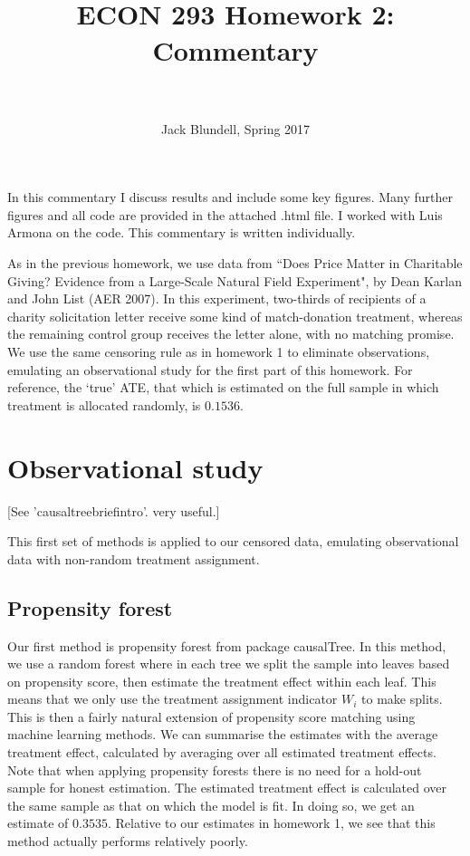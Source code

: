 \documentclass[paper=letter, fontsize=11pt]{scrartcl} %
\title{	
\normalfont \normalsize 
\horrule{0.5pt} \\[0.4cm] %
 \large{{\textbf{ECON 293 Homework 2: Commentary}}} \\ %
\horrule{2pt} \\[0.5cm] %
}
\author{\small{Jack Blundell, Spring 2017}} %
\date{} %
\begin{document}
\maketitle %

In this commentary I discuss results and include some key figures. Many further figures and all code are provided in the attached .html file. I worked with Luis Armona on the code. This commentary is written individually.

As in the previous homework, we use data from ``Does Price Matter in Charitable Giving? Evidence from a Large-Scale Natural Field Experiment", by Dean Karlan and John List (AER 2007). In this experiment, two-thirds of recipients of a charity solicitation letter receive some kind of match-donation treatment, whereas the remaining control group receives the letter alone, with no matching promise. We use the same censoring rule as in homework 1 to eliminate observations, emulating an observational study for the first part of this homework. For reference, the `true' ATE, that which is estimated on the full sample in which treatment is allocated randomly, is $0.1536$.

\section{Observational study}

[See 'causaltreebriefintro'. very useful.]

This first set of methods is applied to our censored data, emulating observational data with non-random treatment assignment.

\subsection{Propensity forest}

Our first method is propensity forest from package causalTree. In this method, we use a random forest where in each tree we split the sample into leaves based on propensity score, then estimate the treatment effect within each leaf. This means that we only use the treatment assignment indicator $W_i$ to make splits. This is then a fairly natural extension of propensity score matching using machine learning methods. We can summarise the estimates with the average treatment effect, calculated by averaging over all estimated treatment effects. Note that when applying propensity forests there is no need for a hold-out sample for honest estimation. The estimated treatment effect is calculated over the same sample as that on which the model is fit. In doing so, we get an estimate of $0.3535$. Relative to our estimates in homework 1, we see that this method actually performs relatively poorly.
\end{document}
